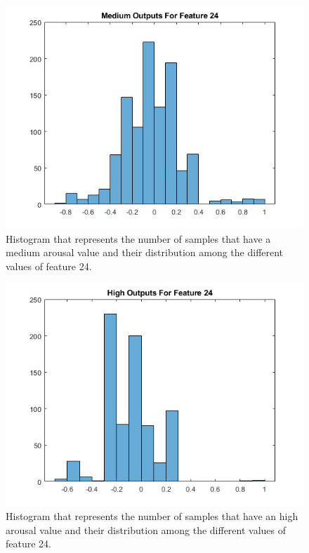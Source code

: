 \documentclass[a4paper]{report}
\begin{document}
	\begin{figure}[htbp]
		\centering
		\includegraphics[scale=0.7]{img/hist_example2.png}
		\caption{Histogram that represents the number of samples that have a medium arousal value and their distribution among the different values of feature 24.}
		\label{img: hist_example2}
	\end{figure}

\newpage
	\begin{figure}[htbp]
		\centering
		\includegraphics[scale=0.7]{img/hist_example3.png}
		\caption{Histogram that represents the number of samples that have an high arousal value and their distribution among the different values of feature 24.}
		\label{img: hist_example3}
	\end{figure}
	
\end{document}
